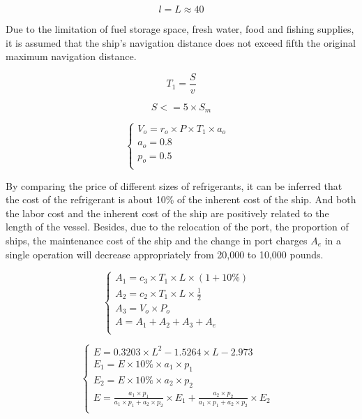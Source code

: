 \documentclass{mcmthesis}
\begin{document}
\begin{equation}\label{4}
l=L\approx 40
\end{equation}

Due to the limitation of fuel storage space, fresh water, food and fishing supplies, it is assumed that the ship's navigation distance does not exceed fifth the original maximum navigation distance.

\begin{equation}\label{4}
T_1=\frac{S}{v}
\end{equation}

\begin{equation}\label{4}
S<=5\times S_m
\end{equation}

\begin{equation}
\left\{
\begin{array}{lr}
V_o=r_o \times P \times T_1 \times a_o &\\
a_o=0.8  & \\    p_o=0.5 \\
\end{array}
\right.
\end{equation}

By comparing the price of different sizes of refrigerants, it can be inferred that the cost of the refrigerant is about 10\% of the inherent cost of the ship. And both the labor cost and the inherent cost of the ship are positively related to the length of the vessel. Besides, due to the relocation of the port, the proportion of ships, the maintenance cost of the ship and the change in port charges $A_e$ in a single operation will decrease appropriately from 20,000 to 10,000 pounds.

			\begin{equation}
			\left\{
			\begin{array}{lr}

A_1=c_3 \times T_1\times L \times (1+10\%) &\\
A_2=c_2  \times T_1 \times L \times  \frac{1}{2} &\\
A_3=V_o  \times P_o &\\
A=A_1+A_2+A_3+A_e \\		
			\end{array}
			\right.
			\end{equation}



\begin{equation}
\left\{
\begin{array}{lr}
E= 0.3203\times L^2 -1.5264\times L -  2.973&\\
E_1=E \times 10\% \times a_1 \times p_1 &\\
E_2=E\times 10\% \times a_2 \times p_2 &\\
E= \frac{a_1 \times p_1}{a_1 \times p_1+ a_2 \times p_2} \times E_1 + \frac{a_2 \times p_2}{a_1 \times p_1+ a_2 \times p_2} \times E_2\\

\end{array}
\right.
\end{equation}
\end{document}
